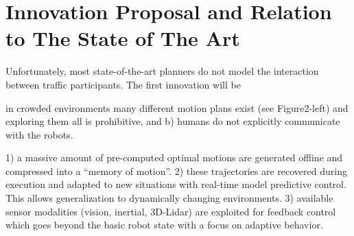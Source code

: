 \section{Innovation Proposal and Relation to The State of The Art}\label{related_work}

Unfortunately, most state-of-the-art planners do not model the interaction between traffic participants. The first innovation will be

in crowded environments many different
motion plans exist (see Figure2-left) and exploring them all is prohibitive, and b) humans
do not explicitly communicate with the robots.


1) a massive amount of pre-computed optimal motions are generated offline and compressed into a ``memory of motion''.
2) these trajectories are recovered during execution and adapted to new situations with real-time model predictive control.
This allows generalization to dynamically changing environments.
3) available sensor modalities (vision, inertial, 3D-Lidar) are exploited for feedback control which goes beyond the basic robot
state with a focus on adaptive behavior.


